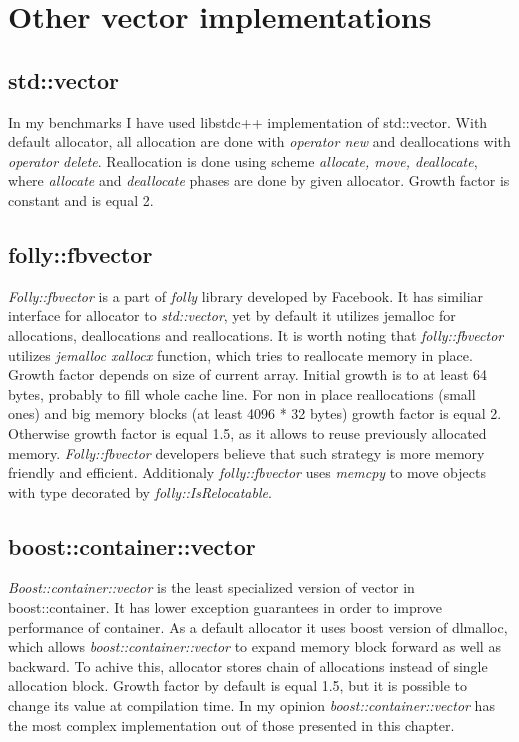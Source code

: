 \documentclass[declaration, inz, english, shortabstract]{iithesis}
\author         {Wojciech Oziębły}
\begin{document}

\chapter{Other vector implementations}
\section{std::vector}
In my benchmarks I have used libstdc++ implementation\cite{std::vector_impl} of std::vector. With default allocator, all allocation are done with {\it operator new} and deallocations with {\it operator delete}. Reallocation is done using scheme {\it allocate, move, deallocate}, where {\it allocate} and {\it  deallocate} phases are done by given allocator. Growth factor is constant and is equal 2.

\section{folly::fbvector}
{\it Folly::fbvector}\cite{folly::fbvector_impl} is a part of {\it folly} library developed by Facebook. It has similiar interface for allocator to {\it std::vector}, yet by default it utilizes jemalloc for allocations, deallocations and reallocations\cite{folly::fbvector_description}. It is worth noting that {\it folly::fbvector} utilizes {\it jemalloc xallocx} function, which tries to reallocate memory in place. Growth factor depends on size of current array. Initial growth is to at least 64 bytes, probably to fill whole cache line. For non in place reallocations (small ones) and big memory blocks (at least 4096 * 32 bytes) growth factor is equal 2. Otherwise growth factor is equal 1.5, as it allows to reuse previously allocated memory. {\it Folly::fbvector} developers believe that such strategy is more memory friendly and efficient\cite{folly::fbvector_description}. Additionaly {\it folly::fbvector} uses {\it memcpy} to move objects with type decorated by {\it folly::IsRelocatable}.

\section{boost::container::vector}
{\it Boost::container::vector}\cite{boost::container::vector_impl} is the least specialized version of vector in {boost::container}. It has lower exception guarantees in order to improve performance of container\cite{boost_exceptions}. As a default allocator it uses boost version of dlmalloc\cite{dlmalloc}, which allows {\it boost::container::vector} to expand memory block forward as well as backward. To achive this, allocator stores chain of allocations instead of single allocation block. Growth factor by default is equal 1.5, but it is possible to change its value at compilation time. In my opinion {\it boost::container::vector} has the most complex implementation out of those presented in this chapter.
\end{document}
